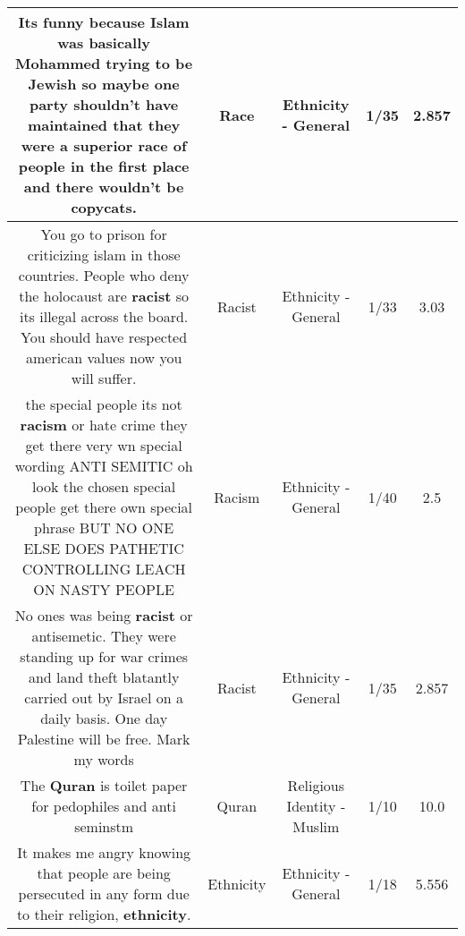 \documentclass[11pt]{article}
\newlength\mylength
\begin{document}
\begin{center}
\begin{longtable}{|C{.65\mylength}|C{.30\mylength}|C{.12\mylength}|C{.12\mylength}|C{.12\mylength}|}
  \small Its funny because Islam was basically Mohammed trying to be Jewish so maybe one party shouldn't have maintained that they were a superior \textbf{race} of people in the first place and there wouldn't be copycats.\normalsize   & Race & Ethnicity - General & 1/35 & 2.857 \\  \hline
  \small You go to prison for criticizing islam in those countries. People who deny the holocaust are \textbf{racist} so its illegal across the board. You should have respected american values now you will suffer.\normalsize   & Racist & Ethnicity - General & 1/33 & 3.03 \\  \hline
  \small the special people its not \textbf{racism} or hate crime they get there very wn special wording ANTI SEMITIC oh look the chosen special people get there own special phrase BUT NO ONE ELSE DOES PATHETIC CONTROLLING LEACH ON NASTY PEOPLE\normalsize   & Racism & Ethnicity - General & 1/40 & 2.5 \\  \hline
  \small No ones was being \textbf{racist} or antisemetic. They were standing up for war crimes and land theft blatantly carried out by Israel on a daily basis. One day Palestine will be free. Mark my words\normalsize   & Racist & Ethnicity - General & 1/35 & 2.857 \\  \hline
  \small The \textbf{Quran} is toilet paper for pedophiles and anti seminstm\normalsize   & Quran & Religious Identity - Muslim & 1/10 & 10.0 \\  \hline
  \small It makes me angry knowing that people are being persecuted in any form due to their religion, \textbf{ethnicity}.\normalsize   & Ethnicity & Ethnicity - General & 1/18 & 5.556 \\  \hline

\end{longtable}
\end{center}
\end{document}
